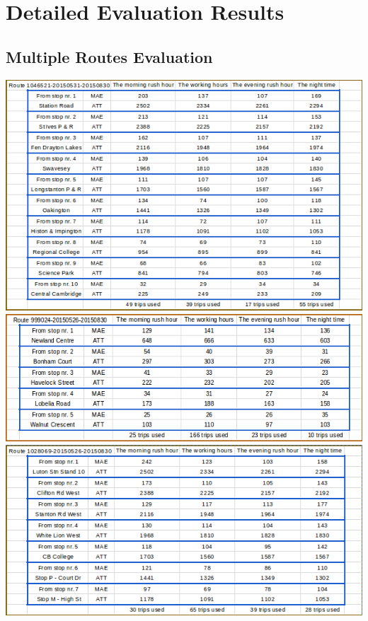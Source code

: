\documentclass[12pt,a4paper,oneside,openright]{report}
\begin{document}
\chapter{Detailed Evaluation Results}

\section{Multiple Routes Evaluation}

\label{B1}

\includegraphics[width=\textwidth]{figs/table_of_1046521.png}
\includegraphics[width=\textwidth]{figs/table_of_999024.png}
\includegraphics[width=\textwidth]{figs/table_of_1028069.png}
\end{document}
